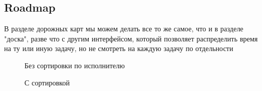 \documentclass[12pt, a4paper]{article}
\begin{document}
    \newpage
    \subsection{Roadmap}
    В разделе дорожных карт мы можем делать все то же самое, что и в разделе "доска", разве что с другим интерфейсом,
    который позволяет распределить время на ту или иную задачу, но не смотреть на каждую задачу по отдельности
    \begin{multicols}{2}[]
        \begin{figure}[H]
            \caption{Без сортировки по исполнителю}
        \end{figure}
        \columnbreak
        \begin{figure}[H]
            \caption{С сортировкой}
        \end{figure}
    \end{multicols}
\end{document}
